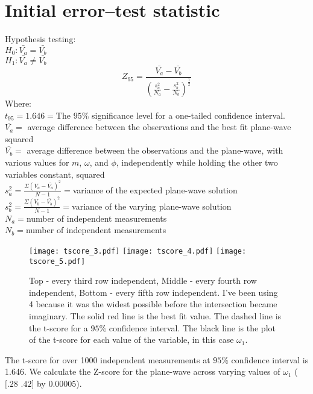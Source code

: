 \documentclass[preprint,12pt]{elsarticle}
\begin{document}
\section{Initial error--test statistic}
\noindent Hypothesis testing:\\
$H_0 : \bar{V_a} = \bar{V_b}$\\
$H_1 : \bar{V_a} \neq \bar{V_b}$\\
\begin{equation}
Z_{95} = \frac{\bar{V_a}-\bar{V_b}}{(\frac{s^2_a}{N_a}-\frac{s^2_b}{N_b})^{\frac{1}{2}}}
\end{equation}
Where:\\
$t_{95} = 1.646 = $The $95\%$ significance level for a one-tailed confidence interval.\\
$\bar{V_a} = $ average difference between the observations and the best fit plane-wave squared\\
$\bar{V_b} = $ average difference between the observations and the plane-wave, with various values for $m$, $\omega$, and $\phi$, independently while holding the other two variables constant, squared\\
$s_a^2 = \frac{\Sigma(V_a-\bar{V_a})^2}{N-1} = $variance of the expected plane-wave solution\\
$s_b^2 = \frac{\Sigma(V_b-\bar{V_b})^2}{N-1} = $variance of the varying plane-wave solution\\
$N_a = $number of independent measurements\\
$N_b = $number of independent measurements\\

\begin{figure}[h]
    \centering
    \texttt{[image: tscore\_3.pdf]}
    \texttt{[image: tscore\_4.pdf]}
    \texttt{[image: tscore\_5.pdf]}
    \caption{Top - every third row independent, Middle - every fourth row independent, Bottom - every fifth row independent.  I've been using 4 because it was the widest possible before the intersection became imaginary.  The solid red line is the best fit value.  The dashed line is the t-score for a $95\%$ confidence interval.  The black line is the plot of the t-score for each value of the variable, in this case $\omega_1$.}
    \label{fig:tscore}
\end{figure}

The t-score for over 1000 independent measurements at $95\%$ confidence interval is 1.646.  We calculate the Z-score for the plane-wave across varying values of $\omega_1$ ($[.28$ $.42]$ by $0.00005$).
\end{document}
